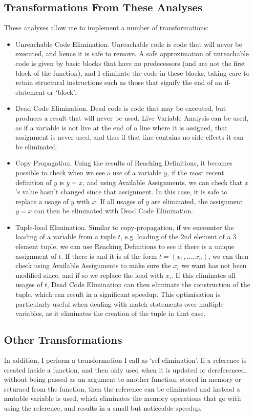 \subsection{Transformations From These Analyses}
These analyses allow me to implement a number of transformations:
\begin{itemize}
\item Unreachable Code Elimination. Unreachable code is code that will never be executed, and hence it is safe to remove. A safe approximation of unreachable code is given by basic blocks that have no predecessors (and are not the first block of the function), and I eliminate the code in these blocks, taking care to retain structural instructions such as those that signify the end of an if-statement or `block'.
\item Dead Code Elimination. Dead code is code that may be executed, but produces a result that will never be used. Live Variable Analysis can be used, as if a variable is not live at the end of a line where it is assigned, that assignment is never used, and thus if that line contains no side-effects it can be eliminated.
\item Copy Propagation. Using the results of Reaching Definitions, it becomes possible to check when we see a use of a variable $y$, if the most recent definition of $y$ is $y = x$, and using Available Assignments, we can check that $x$'s value hasn't changed since that assignment. In this case, it is safe to replace a usage of $y$ with $x$. If all usages of $y$ are eliminated, the assignment $y = x$ can then be eliminated with Dead Code Elimination.
\item Tuple-load Elimination. Similar to copy-propagation, if we encounter the loading of a variable from a tuple $t$, e.g. loading of the 2nd element of a 3 element tuple, we can use Reaching Definitions to see if there is a unique assignment of $t$. If there is and it is of the form $t = (x_1, ..., x_n)$, we can then check using Available Assignments to make sure the $x_i$ we want has not been modified since, and if so we replace the load with $x_i$. If this eliminates all usages of $t$, Dead Code Elimination can then eliminate the construction of the tuple, which can result in a significant speedup. This optimisation is particularly useful when dealing with match statements over multiple variables, as it eliminates the creation of the tuple in that case.
\end{itemize}

\subsection{Other Transformations}
In addition, I perform a transformation I call as `ref elimination'. If a reference is created inside a function, and then only used when it is updated or dereferenced, without being passed as an argument to another function, stored in memory or returned from the function, then the reference can be eliminated and instead a mutable variable is used, which eliminates the memory operations that go with using the reference, and results in a small but noticeable speedup.

